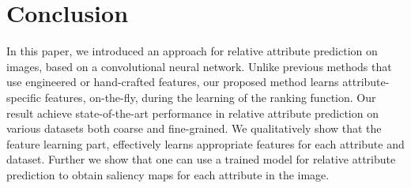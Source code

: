 

\section{Conclusion}
\label{sec.5}

In this paper, we introduced an approach for relative attribute prediction on images, based on a convolutional neural network. Unlike previous methods that use engineered or hand-crafted features, our proposed method learns attribute-specific features, on-the-fly, during the learning of the ranking function. Our result achieve state-of-the-art performance in relative attribute prediction on various datasets both coarse and fine-grained.
We qualitatively show that the feature learning part, effectively learns appropriate features for each attribute and dataset.
Further we show that one can use a trained model for relative attribute prediction to obtain saliency maps for each attribute in the image.

